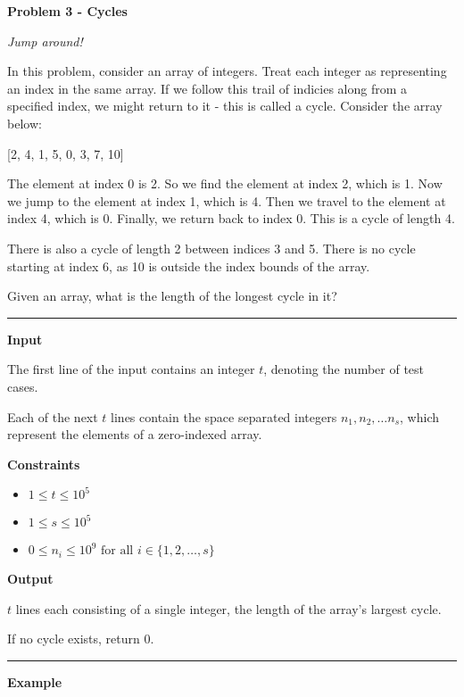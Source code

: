 \LARGE \textbf{Problem 3 - Cycles} \normalsize

{\itshape Jump around!}

In this problem, consider an array of integers. 
Treat each integer as representing an index in the same array. 
If we follow this trail of indicies along from a specified index, we might return to it - this is called a cycle. 
Consider the array below:

\begin{center}
    \LARGE [2, 4, 1, 5, 0, 3, 7, 10]
\end{center}

The element at index 0 is 2.
So we find the element at index 2, which is 1.
Now we jump to the element at index 1, which is 4.
Then we travel to the element at index 4, which is 0.
Finally, we return back to index 0.
This is a cycle of length 4.

There is also a cycle of length 2 between indices 3 and 5.
There is no cycle starting at index 6, as 10 is outside the index bounds of the array.

Given an array, what is the length of the longest cycle in it?

\vspace{8pt}
\hrule

\textbf{Input}

The first line of the input contains an integer $t$, denoting the number of test cases.

Each of the next $t$ lines contain the space separated integers $n_1, n_2, \dots n_s$, which represent the elements of a zero-indexed array.

\textbf{Constraints}

\begin{itemize}
    \item $1 \leq t \leq 10^5$
    \item $1 \leq s \leq 10^5$
    \item $0 \leq n_i \leq 10^9 \text{ for all } i \in \{1, 2, \dots, s\}$
\end{itemize}

\textbf{Output}

$t$ lines each consisting of a single integer, the length of the array's largest cycle.

If no cycle exists, return 0.

\vspace{8pt}
\hrule

\textbf{Example}

